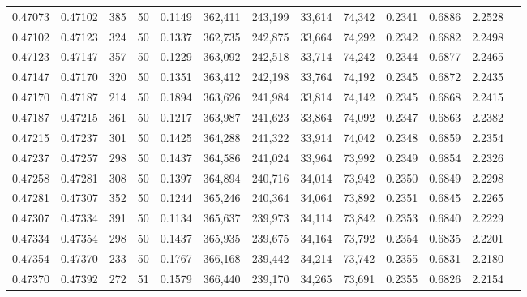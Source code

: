 \begin{tabular}{rrrrrrrrrrrrr}
0.47073 & 0.47102 &   385 &  50 &                                     0.1149 & 362,411 & 243,199 &  33,614 &  74,342 & 0.2341 & 0.6886 & 2.2528 \\
0.47102 & 0.47123 &   324 &  50 &                                     0.1337 & 362,735 & 242,875 &  33,664 &  74,292 & 0.2342 & 0.6882 & 2.2498 \\
0.47123 & 0.47147 &   357 &  50 &                                     0.1229 & 363,092 & 242,518 &  33,714 &  74,242 & 0.2344 & 0.6877 & 2.2465 \\
0.47147 & 0.47170 &   320 &  50 &                                     0.1351 & 363,412 & 242,198 &  33,764 &  74,192 & 0.2345 & 0.6872 & 2.2435 \\
0.47170 & 0.47187 &   214 &  50 &                                     0.1894 & 363,626 & 241,984 &  33,814 &  74,142 & 0.2345 & 0.6868 & 2.2415 \\
0.47187 & 0.47215 &   361 &  50 &                                     0.1217 & 363,987 & 241,623 &  33,864 &  74,092 & 0.2347 & 0.6863 & 2.2382 \\
0.47215 & 0.47237 &   301 &  50 &                                     0.1425 & 364,288 & 241,322 &  33,914 &  74,042 & 0.2348 & 0.6859 & 2.2354 \\
0.47237 & 0.47257 &   298 &  50 &                                     0.1437 & 364,586 & 241,024 &  33,964 &  73,992 & 0.2349 & 0.6854 & 2.2326 \\
0.47258 & 0.47281 &   308 &  50 &                                     0.1397 & 364,894 & 240,716 &  34,014 &  73,942 & 0.2350 & 0.6849 & 2.2298 \\
0.47281 & 0.47307 &   352 &  50 &                                     0.1244 & 365,246 & 240,364 &  34,064 &  73,892 & 0.2351 & 0.6845 & 2.2265 \\
0.47307 & 0.47334 &   391 &  50 &                                     0.1134 & 365,637 & 239,973 &  34,114 &  73,842 & 0.2353 & 0.6840 & 2.2229 \\
0.47334 & 0.47354 &   298 &  50 &                                     0.1437 & 365,935 & 239,675 &  34,164 &  73,792 & 0.2354 & 0.6835 & 2.2201 \\
0.47354 & 0.47370 &   233 &  50 &                                     0.1767 & 366,168 & 239,442 &  34,214 &  73,742 & 0.2355 & 0.6831 & 2.2180 \\
0.47370 & 0.47392 &   272 &  51 &                                     0.1579 & 366,440 & 239,170 &  34,265 &  73,691 & 0.2355 & 0.6826 & 2.2154 \\

\end{tabular}
